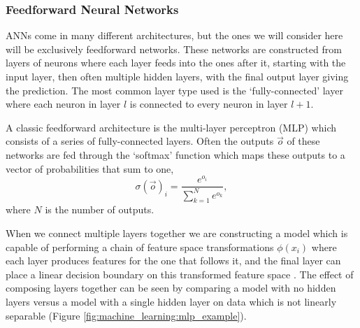 \subsubsection{Feedforward Neural Networks}
ANNs come in many different architectures, but the ones we will consider here will be exclusively feedforward networks. 
These networks are constructed from layers of neurons where each layer feeds into the ones after it, starting with the input layer, then often multiple hidden layers, with the final output layer giving the prediction. 
The most common layer type used is the `fully-connected' layer where each neuron in layer $l$ is connected to every neuron in layer $l+1$. 

A classic feedforward architecture is the multi-layer perceptron (MLP) which consists of a series of fully-connected layers. Often the outputs $\vec{o}$ of these networks are fed through the `softmax' function which maps these outputs to a vector of probabilities that sum to one,
\begin{equation}
    \sigma(\vec{o})_{i} = \frac{e^{o_{i}}}{\sum_{k=1}^{N}e^{o_{k}}},
\end{equation}
where $N$ is the number of outputs. 

When we connect multiple layers together we are constructing a model which is capable of performing a chain of feature space transformations $\phi(x_{i})$ where each layer produces features for the one that follows it, and the final layer can place a linear decision boundary on this transformed feature space \cite{DeepLearningBook}. 
The effect of composing layers together can be seen by comparing a model with no hidden layers versus a model with a single hidden layer on data which is not linearly separable (Figure \ref{fig:machine_learning:mlp_example}).

